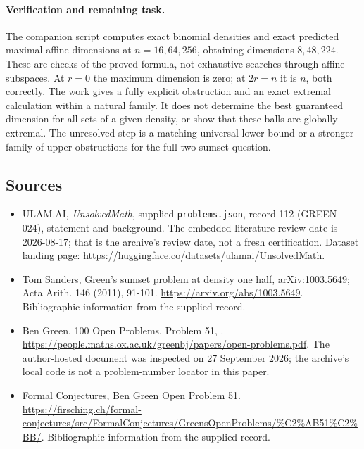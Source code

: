 \documentclass[11pt,a4paper]{article}
\begin{document}
\paragraph{Verification and remaining task.}
The companion script computes exact binomial densities and exact predicted maximal affine dimensions at $n=16,64,256$, obtaining dimensions $8,48,224$. These are checks of the proved formula, not exhaustive searches through affine subspaces. At $r=0$ the maximum dimension is zero; at $2r=n$ it is $n$, both correctly. The work gives a fully explicit obstruction and an exact extremal calculation within a natural family. It does not determine the best guaranteed dimension for all sets of a given density, or show that these balls are globally extremal. The unresolved step is a matching universal lower bound or a stronger family of upper obstructions for the full two-sumset question.

\subsection{Sources}

{\small

\begin{itemize}

\item[\hypertarget{source:112:1}{S1}] ULAM.AI, \emph{UnsolvedMath}, supplied \texttt{problems.json}, record 112 (GREEN-024), statement and background. The embedded literature-review date is 2026-08-17; that is the archive’s review date, not a fresh certification. Dataset landing page: \url{https://huggingface.co/datasets/ulamai/UnsolvedMath}.

\item[\hypertarget{source:112:2}{S2}] Tom Sanders, Green's sumset problem at density one half, arXiv:1003.5649; Acta Arith. 146 (2011), 91-101. \url{https://arxiv.org/abs/1003.5649}. Bibliographic information from the supplied record.

\item[\hypertarget{source:112:3}{S3}] Ben Green, 100 Open Problems, Problem 51, . \url{https://people.maths.ox.ac.uk/greenbj/papers/open-problems.pdf}. The author-hosted document was inspected on 27 September 2026; the archive’s local code is not a problem-number locator in this paper.

\item[\hypertarget{source:112:4}{S4}] Formal Conjectures, Ben Green Open Problem 51. \url{https://firsching.ch/formal-conjectures/src/FormalConjectures/GreensOpenProblems/%C2%AB51%C2%BB/}. Bibliographic information from the supplied record.

\end{itemize}

}

\label{end:112}
\end{document}
